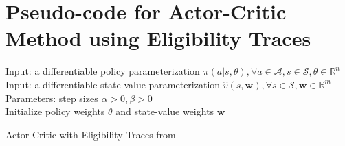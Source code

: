 \documentclass[11pt]{article}
\begin{document}
\section{Pseudo-code for Actor-Critic Method using Eligibility Traces}\label{a:pseudo_code_et}
\begin{algorithm}[!h]
\SetAlgoLined
    Input: a differentiable policy parameterization $\pi(a | s, \theta), \forall a \in \mathcal{A}, s \in \mathcal{S}, \theta \in \mathbb{R}^{n}$\\
    Input: a differentiable state-value parameterization  $\hat{v}(s, \mathbf{w}), \forall s \in \mathcal{S}, \mathbf{w} \in \mathbb{R}^{m}$\\
    Parameters: step sizes $\alpha > 0, \beta > 0$ \\
    Initialize policy weights $\theta$ and state-value weights $\mathbf{w}$ 

 \caption{Actor-Critic with Eligibility Traces from \cite{RLbook}}
\end{algorithm}
\end{document}
